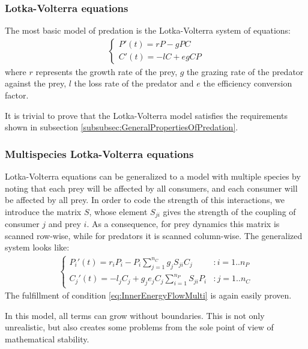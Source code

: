 \subsubsection{Lotka-Volterra equations}
\label{subsubsec:LotkaVolterra}

The most basic model of predation is the Lotka-Volterra system of equations:
%
\begin{eqnarray}
\label{eq:LotkaVolterra}
	\begin{cases}
	P'(t) = r P - g P C
	\\
	C'(t) = - l C + e g C P
	\end{cases}
\end{eqnarray}
%
where $r$ represents the growth rate of the prey, $g$ the grazing rate of the predator against the prey, $l$ the loss rate of the predator and $e$ the efficiency conversion factor.

It is trivial to prove that the Lotka-Volterra model satisfies the requirements shown in subsection \ref{subsubsec:GeneralPropertiesOfPredation}.

\subsubsection{Multispecies Lotka-Volterra equations}
\label{subsubsec:LotkaVolterraMulti}

Lotka-Volterra equations can be generalized to a model with multiple species by noting that each prey will be affected by all consumers, and each consumer will be affected by all prey. In order to code the strength of this interactions, we introduce the matrix $S$, whose element $S_{ji}$ gives the strength of the coupling of consumer $j$ and prey $i$. As a consequence, for prey dynamics this matrix is scanned row-wise, while for predators it is scanned column-wise. The generalized system looks like:
%
\begin{eqnarray}
\label{eq:LotkaVolterraMulti}
	\begin{cases}
	P_i'(t) = r_i P_i - P_i \sum_{j = 1}^{n_C} g_j S_{ji} C_j & : i = 1..n_P
	\\
	C_j'(t) = - l_j C_j +  g_j e_j C_j \sum_{i = 1}^{n_P} S_{ji} P_i  & : j = 1..n_C
	\end{cases}
\end{eqnarray}
%
The fulfillment of condition \eqref{eq:InnerEnergyFlowMulti} is again easily proven.

In this model, all terms can grow without boundaries. This is not only unrealistic, but also creates some problems from the sole point of view of mathematical stability.

